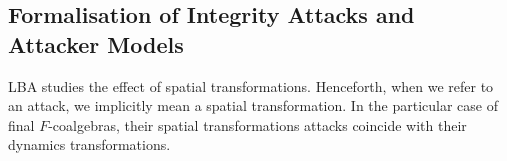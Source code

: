 





\subsection{Formalisation of Integrity Attacks and Attacker Models}
\label{sec:Latent:AttackerModels}
LBA studies the effect of spatial transformations. Henceforth, when we refer to an attack, we implicitly mean a spatial transformation. In the particular case of final $F$-coalgebras, their spatial transformations attacks coincide with their dynamics transformations. 

